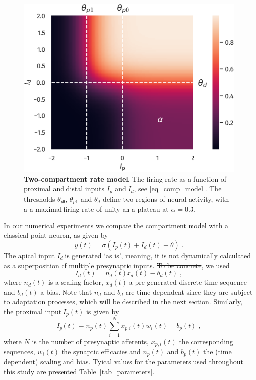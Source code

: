 \documentclass[utf8]{frontiersSCNS} %
\providecommand{\DIFaddtex}[1]{{\protect\color{blue}\uwave{#1}}} %
\providecommand{\DIFdeltex}[1]{{\protect\color{red}\sout{#1}}}                      %
\providecommand{\DIFaddbegin}{} %
\providecommand{\DIFaddend}{} %
\providecommand{\DIFdelbegin}{} %
\providecommand{\DIFdelend}{} %
\providecommand{\DIFadd}[1]{\texorpdfstring{\DIFaddtex{#1}}{#1}} %
\providecommand{\DIFdel}[1]{\texorpdfstring{\DIFdeltex{#1}}{}} %
\begin{document}
\begin{figure}[t]
\centering
\includegraphics[width=0.6\columnwidth]{plot_comp_mod_marks.png}
\caption{{\bf Two-compartment rate model.} 
The firing rate as a function of proximal and distal 
inputs $I_p$ and $I_d$, 
see \eqref{eq_comp_model}. 
The thresholds $\theta_{p0}$, $\theta_{p1}$ and 
$\theta_d$ define two regions of neural activity,
with a a maximal firing rate of unity an a plateau
at $\alpha=0.3$.}
\label{fig_comp_model}
\end{figure}

In our numerical experiments we compare 
the compartment model with a classical point 
neuron, as given by
\begin{equation}
y(t) = \sigma\left(I_p(t) + I_d(t) - 
\theta \right) \; .
\label{eq_point_neuron}
\end{equation}
The apical input $I_d$ is generated
`as is', meaning, it is not dynamically 
calculated as a superposition of multiple 
presynaptic inputs. \DIFdelbegin \DIFdel{To be concrete}\DIFdelend \DIFaddbegin \DIFadd{For concreteness}\DIFaddend , we
used
\begin{equation}
I_d(t) = n_d(t) x_d(t) - b_d(t) \; ,
\label{eq_I_d}
\end{equation}
where $n_d(t)$ is a scaling factor, $x_d(t)$ 
a pre-generated discrete time sequence and 
$b_d(t)$ a bias. Note that $n_d$ and $b_d$ 
are time dependent since they are subject 
to adaptation processes, which will be
described in the next section. Similarly, 
the proximal input $I_p(t)$ is given by
\begin{equation}
I_p(t) = n_p(t) \sum_{i=1}^{N} 
x_{p,i}(t) w_i(t) - b_p(t) \; ,
\label{eq_I_p}
\end{equation}
where $N$ is the number of presynaptic afferents, 
$x_{p,i}(t)$ the corresponding sequences, 
$w_i(t)$ the synaptic efficacies and
$n_p(t)$ and $b_p(t)$ the (time dependent)
scaling and bias. Tyical values for the 
parameters used throughout this study
are presented \DIFaddbegin \DIFadd{in }\DIFaddend Table~\ref{tab_parameters}.
\end{document}
